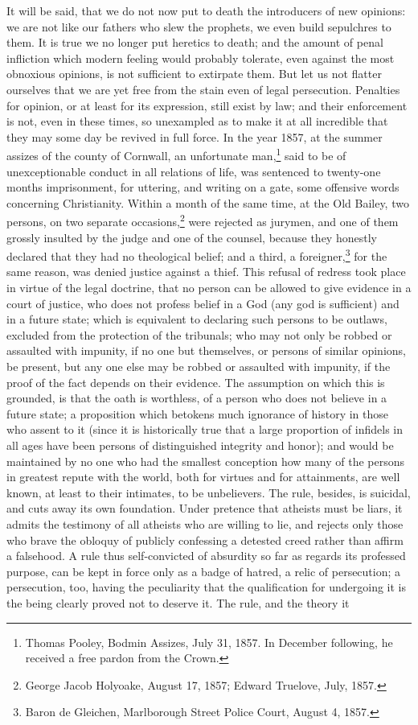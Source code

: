 \documentclass[12pt]{report}
\begin{document}
It will be said, that we do not now put to death the introducers of new opinions: we are not like our fathers who slew the prophets, we even build sepulchres to them. It is true we no longer put heretics to death; and the amount of penal infliction which modern feeling would probably tolerate, even against the most obnoxious opinions, is not sufficient to extirpate them. But let us not flatter ourselves that we are yet free from the stain even of legal persecution. Penalties for opinion, or at least for its expression, still exist by law; and their enforcement is not, even in these times, so unexampled as to make it at all incredible that they may some day be revived in full force. In the year 1857, at the summer assizes of the county of Cornwall, an unfortunate man,\footnote{Thomas Pooley, Bodmin Assizes, July 31, 1857. In December following, he received a free pardon from the Crown.} said to be of unexceptionable conduct in all relations of life, was sentenced to twenty-one months imprisonment, for uttering, and writing on a gate, some offensive words concerning Christianity. Within a month of the same time, at the Old Bailey, two persons, on two separate occasions,\footnote{George Jacob Holyoake, August 17, 1857; Edward Truelove, July, 1857.} were rejected as jurymen, and one of them grossly insulted by the judge and one of the counsel, because they honestly declared that they had no theological belief; and a third, a foreigner,\footnote{Baron de Gleichen, Marlborough Street Police Court, August 4, 1857.} for the same reason, was denied justice against a thief. This refusal of redress took place in virtue of the legal doctrine, that no person can be allowed to give evidence in a court of justice, who does not profess belief in a God (any god is sufficient) and in a future state; which is equivalent to declaring such persons to be outlaws, excluded from the protection of the tribunals; who may not only be robbed or assaulted with impunity, if no one but themselves, or persons of similar opinions, be present, but any one else may be robbed or assaulted with impunity, if the proof of the fact depends on their evidence. The assumption on which this is grounded, is that the oath is worthless, of a person who does not believe in a future state; a proposition which betokens much ignorance of history in those who assent to it (since it is historically true that a large proportion of infidels in all ages have been persons of distinguished integrity and honor); and would be maintained by no one who had the smallest conception how many of the persons in greatest repute with the world, both for virtues and for attainments, are well known, at least to their intimates, to be unbelievers. The rule, besides, is suicidal, and cuts away its own foundation. Under pretence that atheists must be liars, it admits the testimony of all atheists who are willing to lie, and rejects only those who brave the obloquy of publicly confessing a detested creed rather than affirm a falsehood. A rule thus self-convicted of absurdity so far as regards its professed purpose, can be kept in force only as a badge of hatred, a relic of persecution; a persecution, too, having the peculiarity that the qualification for undergoing it is the being clearly proved not to deserve it. The rule, and the theory it 
\end{document}
